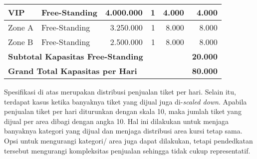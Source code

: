 \begin{longtable}{|l|l|r|r|r|r|}
    VIP                                                             & Free-Standing   & 4.000.000      & 1             & 4.000               & 4.000          \\
    \hline
    Zone A                                                          & Free-Standing   & 3.250.000      & 1             & 8.000               & 8.000          \\
    \hline
    Zone B                                                          & Free-Standing   & 2.500.000      & 1             & 8.000               & 8.000          \\
    \hline
    \multicolumn{5}{|l|}{\textbf{Subtotal Kapasitas Free-Standing}} & \textbf{20.000}                                                                         \\
    \hline \hline

    \multicolumn{5}{|l|}{\textbf{Grand Total Kapasitas per Hari}}   & \textbf{80.000}                                                                         \\
\end{longtable}
\endgroup

Spesifikasi di atas merupakan distribusi penjualan tiket per hari. Selain itu, terdapat kasus ketika banyaknya tiket yang dijual juga di-\textit{scaled down}. Apabila penjualan tiket per hari diturunkan dengan skala 10, maka jumlah tiket yang dijual per area dibagi dengan angka 10. Hal ini dilakukan untuk menjaga banyaknya kategori yang dijual dan menjaga distribusi area kursi tetap sama. Opsi untuk mengurangi kategori/ area juga dapat dilakukan, tetapi pendedkatan tersebut mengurangi kompleksitas penjualan sehingga tidak cukup representatif.
